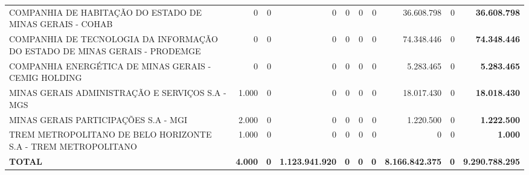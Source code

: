 \documentclass{article}
\begin{document}
\begin{landscape}
\begin{longtable}[c]{m{5.0cm}|m{1.75cm}|m{1.75cm}|m{1.75cm}|m{1.75cm}|m{1.75cm}|m{1.75cm}|m{1.75cm}|m{1.75cm}|m{1.0cm}}
\multicolumn{1}{L{5cm}|}{COMPANHIA DE HABITAÇÃO DO ESTADO DE MINAS GERAIS - COHAB} & \multicolumn{1}{r|}{    0} & \multicolumn{1}{r|}{0} & \multicolumn{1}{r|}{            0} & \multicolumn{1}{r|}{0} & \multicolumn{1}{r|}{0} & \multicolumn{1}{r|}{0} & \multicolumn{1}{r|}{36.608.798} & \multicolumn{1}{r|}{0} & \multicolumn{1}{r}{ \textbf{36.608.798}} \\
\multicolumn{1}{L{5cm}|}{COMPANHIA DE TECNOLOGIA DA INFORMAÇÃO DO ESTADO DE MINAS GERAIS - PRODEMGE} & \multicolumn{1}{r|}{    0} & \multicolumn{1}{r|}{0} & \multicolumn{1}{r|}{            0} & \multicolumn{1}{r|}{0} & \multicolumn{1}{r|}{0} & \multicolumn{1}{r|}{0} & \multicolumn{1}{r|}{74.348.446} & \multicolumn{1}{r|}{0} & \multicolumn{1}{r}{ \textbf{74.348.446}} \\
\multicolumn{1}{L{5cm}|}{COMPANHIA ENERGÉTICA DE MINAS GERAIS - CEMIG HOLDING} & \multicolumn{1}{r|}{    0} & \multicolumn{1}{r|}{0} & \multicolumn{1}{r|}{            0} & \multicolumn{1}{r|}{0} & \multicolumn{1}{r|}{0} & \multicolumn{1}{r|}{0} & \multicolumn{1}{r|}{5.283.465} & \multicolumn{1}{r|}{0} & \multicolumn{1}{r}{ \textbf{5.283.465}} \\
\multicolumn{1}{L{5cm}|}{MINAS GERAIS ADMINISTRAÇÃO E SERVIÇOS S.A - MGS} & \multicolumn{1}{r|}{1.000} & \multicolumn{1}{r|}{0} & \multicolumn{1}{r|}{            0} & \multicolumn{1}{r|}{0} & \multicolumn{1}{r|}{0} & \multicolumn{1}{r|}{0} & \multicolumn{1}{r|}{18.017.430} & \multicolumn{1}{r|}{0} & \multicolumn{1}{r}{ \textbf{18.018.430}} \\
\multicolumn{1}{L{5cm}|}{MINAS GERAIS PARTICIPAÇÕES S.A - MGI} & \multicolumn{1}{r|}{2.000} & \multicolumn{1}{r|}{0} & \multicolumn{1}{r|}{            0} & \multicolumn{1}{r|}{0} & \multicolumn{1}{r|}{0} & \multicolumn{1}{r|}{0} & \multicolumn{1}{r|}{1.220.500} & \multicolumn{1}{r|}{0} & \multicolumn{1}{r}{ \textbf{1.222.500}} \\
\multicolumn{1}{L{5cm}|}{TREM METROPOLITANO DE BELO HORIZONTE S.A - TREM METROPOLITANO} & \multicolumn{1}{r|}{1.000} & \multicolumn{1}{r|}{0} & \multicolumn{1}{r|}{            0} & \multicolumn{1}{r|}{0} & \multicolumn{1}{r|}{0} & \multicolumn{1}{r|}{0} & \multicolumn{1}{r|}{            0} & \multicolumn{1}{r|}{0} & \multicolumn{1}{r}{ \textbf{1.000}} \\
\hline \hline
\multicolumn{1}{L{5cm}|}{ \textbf{TOTAL}} & \multicolumn{1}{r|}{ \textbf{4.000}} & \multicolumn{1}{r|}{ \textbf{0}} & \multicolumn{1}{r|}{ \textbf{1.123.941.920}} & \multicolumn{1}{r|}{ \textbf{0}} & \multicolumn{1}{r|}{ \textbf{0}} & \multicolumn{1}{r|}{ \textbf{0}} & \multicolumn{1}{r|}{ \textbf{8.166.842.375}} & \multicolumn{1}{r|}{ \textbf{0}} & \multicolumn{1}{r}{ \textbf{9.290.788.295}} \\\end{longtable}\end{landscape}
\end{document}
